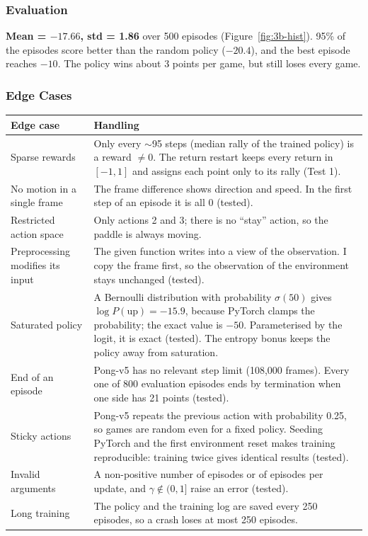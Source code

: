 \subsubsection{Evaluation}


\textbf{Mean = $-17.66$, std = 1.86} over 500 episodes (Figure~\ref{fig:3b-hist}). 95\% of the episodes score better than the random policy ($-20.4$), and the best episode reaches $-10$. The policy wins about 3 points per game, but still loses every game.

\subsubsection{Edge Cases}

\begin{center}
\small
\begin{tabularx}{\textwidth}{@{}p{3.6cm}L@{}}
  \toprule
  \textbf{Edge case} & \textbf{Handling} \\
  \midrule
  Sparse rewards & Only every $\sim$95 steps (median rally of the trained policy) is a reward $\neq 0$. The return restart keeps every return in $[-1, 1]$ and assigns each point only to its rally (Test 1). \\
  No motion in a single frame & The frame difference shows direction and speed. In the first step of an episode it is all 0 (tested). \\
  Restricted action space & Only actions 2 and 3; there is no ``stay'' action, so the paddle is always moving. \\
  Preprocessing modifies its input & The given function writes into a view of the observation. I copy the frame first, so the observation of the environment stays unchanged (tested). \\
  Saturated policy & A Bernoulli distribution with probability $\sigma(50)$ gives $\log P(\text{up}) = -15.9$, because PyTorch clamps the probability; the exact value is $-50$. Parameterised by the logit, it is exact (tested). The entropy bonus keeps the policy away from saturation. \\
  End of an episode & Pong-v5 has no relevant step limit (108,000 frames). Every one of 800 evaluation episodes ends by termination when one side has 21 points (tested). \\
  Sticky actions & Pong-v5 repeats the previous action with probability 0.25, so games are random even for a fixed policy. Seeding PyTorch and the first environment reset makes training reproducible: training twice gives identical results (tested). \\
  Invalid arguments & A non-positive number of episodes or of episodes per update, and $\gamma \notin (0, 1]$ raise an error (tested). \\
  Long training & The policy and the training log are saved every 250 episodes, so a crash loses at most 250 episodes. \\
  \bottomrule
\end{tabularx}
\end{center}

